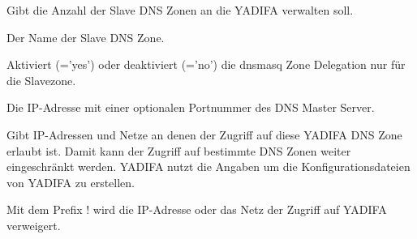 \begin{description}

    Gibt die Anzahl der Slave DNS Zonen an die YADIFA verwalten soll.


    Der Name der Slave DNS Zone.


    Aktiviert (='yes') oder deaktiviert (='no') die dnsmasq Zone Delegation nur für die Slavezone.


    Die IP-Adresse mit einer optionalen Portnummer des DNS Master Server.


    Gibt IP-Adressen und Netze an denen der Zugriff auf diese YADIFA
    DNS Zone erlaubt ist. Damit kann der Zugriff auf bestimmte DNS
    Zonen weiter eingeschränkt werden. YADIFA nutzt die Angaben um die
    Konfigurationsdateien von YADIFA zu erstellen.

    Mit dem Prefix ! wird die IP-Adresse oder das Netz der Zugriff auf
    YADIFA verweigert.

\end{description}
